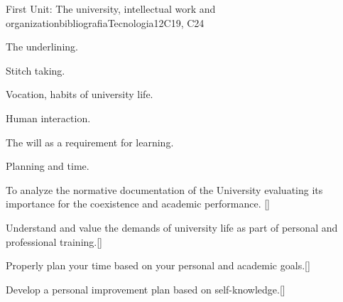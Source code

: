 \begin{syllabus}
\begin{unit}{}{First Unit: The university, intellectual work and organization}{bibliografiaTecnologia}{12}{C19, C24}
\begin{topics}
        \item The underlining.
        \item Stitch taking.
        \item Vocation, habits of university life.
        \item Human interaction.
        \item The will as a requirement for learning.
        \item Planning and time.
\end{topics}
\begin{learningoutcomes}
        \item To analyze the normative documentation of the University evaluating its importance for the coexistence and academic performance. [\Usage]
        \item Understand and value the demands of university life as part of personal and professional training.[\Usage]
        \item Properly plan your time based on your personal and academic goals.[\Usage]
        \item Develop a personal improvement plan based on self-knowledge.[\Usage]
\end{learningoutcomes}
\end{unit}


\end{syllabus}
